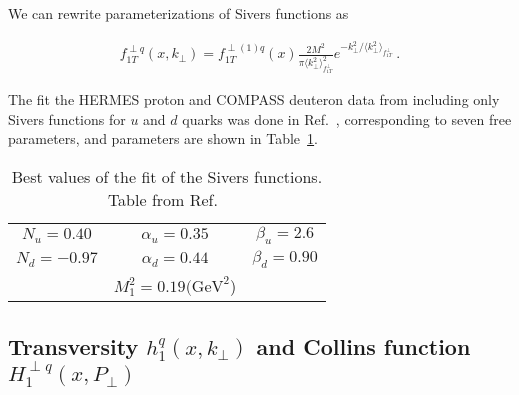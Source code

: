 \documentclass[a4paper,11pt]{article}
\newcommand{\ba}{\begin{eqnarray}}
\newcommand{\ea}{\end{eqnarray}}
\newcommand{\la}{\langle}
\newcommand{\ra}{\rangle}
\def\kperp{k_\perp}
\def\avkperp{\la \kperp^2 \ra}
\begin{document}
We can rewrite parameterizations of Sivers functions as

\ba
f_{1T}^{\perp q}(x,\kperp) =  f_{1T}^{\perp (1) q}(x)   \frac{2 M^2}{\pi \avkperp_{f_{1T}^\perp}^2} e^{-\kperp^2/{\avkperp_{f_{1T}^\perp}}}
\label{sivers_new} \ .
\ea

The fit the HERMES proton and COMPASS deuteron data from 
including only Sivers functions for $u$ and $d$ quarks was done in Ref.~\cite{Anselmino:2011gs},
corresponding to seven free parameters, and parameters are shown in Table~\ref{tab:a}.


\begin{table}
\centering
\begin{tabular}{ccc}
\hline
$N_u=0.40$ & $\alpha_u=0.35$ & $\beta_u=2.6$ \\
$N_d=-0.97$ & $\alpha_d=0.44$ & $\beta_d=0.90$\\
& $M_1^2=0.19\textrm{(GeV}^2$) &   \\
\hline
\end{tabular}
\caption{Best values of the fit of the Sivers functions. Table from Ref.~\cite{Anselmino:2011gs}}
\label{tab:a}
\end{table}



\subsection{\boldmath Transversity $h_{1}^{q}(x,k_\perp)$ and 
Collins function $H_{1}^{\perp q}(x,P_\perp)$}
\label{App:basis-h1-H1perp}
\end{document}
